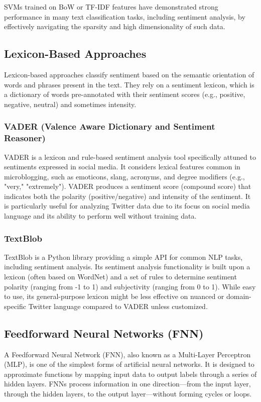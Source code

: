 SVMs trained on BoW or TF-IDF features have demonstrated strong performance in many text classification tasks, including sentiment analysis, by effectively navigating the sparsity and high dimensionality of such data.

\subsection{Lexicon-Based Approaches}
Lexicon-based approaches classify sentiment based on the semantic orientation of words and phrases present in the text. They rely on a sentiment lexicon, which is a dictionary of words pre-annotated with their sentiment scores (e.g., positive, negative, neutral) and sometimes intensity.

\subsubsection{VADER (Valence Aware Dictionary and Sentiment Reasoner)}
VADER is a lexicon and rule-based sentiment analysis tool specifically attuned to sentiments expressed in social media. It considers lexical features common in microblogging, such as emoticons, slang, acronyms, and degree modifiers (e.g., "very," "extremely"). VADER produces a sentiment score (compound score) that indicates both the polarity (positive/negative) and intensity of the sentiment. It is particularly useful for analyzing Twitter data due to its focus on social media language and its ability to perform well without training data.

\subsubsection{TextBlob}
TextBlob is a Python library providing a simple API for common NLP tasks, including sentiment analysis. Its sentiment analysis functionality is built upon a lexicon (often based on WordNet) and a set of rules to determine sentiment polarity (ranging from -1 to 1) and subjectivity (ranging from 0 to 1). While easy to use, its general-purpose lexicon might be less effective on nuanced or domain-specific Twitter language compared to VADER unless customized.

\subsection{Feedforward Neural Networks (FNN)}
A Feedforward Neural Network (FNN), also known as a Multi-Layer Perceptron (MLP), is one of the simplest forms of artificial neural networks. It is designed to approximate functions by mapping input data to output labels through a series of hidden layers. FNNs process information in one direction—from the input layer, through the hidden layers, to the output layer—without forming cycles or loops.

